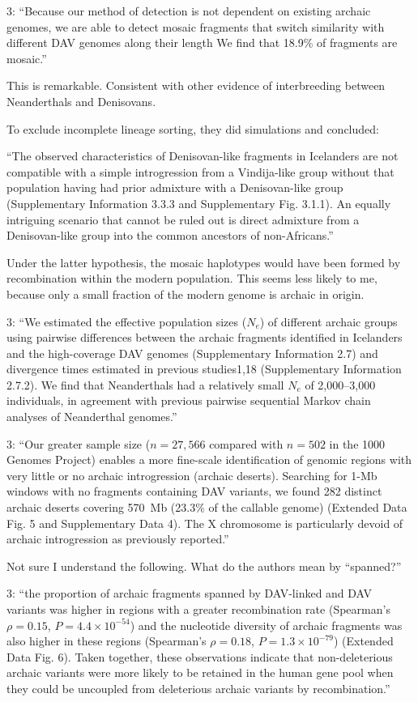 \documentclass{article}
\begin{document}
3: ``Because our method of detection is not dependent on existing
archaic genomes, we are able to detect mosaic fragments that switch
similarity with different DAV genomes along their length We find that
18.9\% of fragments are mosaic.''

This is remarkable. Consistent with other evidence of interbreeding
between Neanderthals and Denisovans.

To exclude incomplete lineage sorting, they did simulations and
concluded:

``The observed characteristics of Denisovan-like fragments in
Icelanders are not compatible with a simple introgression from a
Vindija-like group without that population having had prior admixture
with a Denisovan-like group (Supplementary Information 3.3.3 and
Supplementary Fig. 3.1.1). An equally intriguing scenario that cannot
be ruled out is direct admixture from a Denisovan-like group into the
common ancestors of non-Africans.''

Under the latter hypothesis, the mosaic haplotypes would have been
formed by recombination within the modern population. This seems less
likely to me, because only a small fraction of the modern genome is
archaic in origin.

3: ``We estimated the effective population sizes ($N_e$) of different
archaic groups using pairwise differences between the archaic
fragments identified in Icelanders and the high-coverage DAV genomes
(Supplementary Information 2.7) and divergence times estimated in
previous studies1,18 (Supplementary Information 2.7.2). We find that
Neanderthals had a relatively small $N_e$ of 2,000--3,000 individuals,
in agreement with previous pairwise sequential Markov chain analyses
of Neanderthal genomes.''

3: ``Our greater sample size ($n = 27,566$ compared with $n = 502$ in
the 1000 Genomes Project) enables a more fine-scale identification of
genomic regions with very little or no archaic introgression (archaic
deserts). Searching for 1-Mb windows with no fragments containing DAV
variants, we found 282 distinct archaic deserts covering 570~Mb
(23.3\% of the callable genome) (Extended Data Fig. 5 and
Supplementary Data 4). The X chromosome is particularly devoid of
archaic introgression as previously reported.''

Not sure I understand the following. What do the authors mean by
``spanned?''

3: ``the proportion of archaic fragments spanned by DAV-linked and DAV
variants was higher in regions with a greater recombination rate
(Spearman’s $\rho = 0.15$, $P = 4.4 \times 10^{-54}$) and the
nucleotide diversity of archaic fragments was also higher in these
regions (Spearman’s $\rho = 0.18$, $P = 1.3 \times 10^{-79}$)
(Extended Data Fig. 6). Taken together, these observations indicate
that non-deleterious archaic variants were more likely to be retained
in the human gene pool when they could be uncoupled from deleterious
archaic variants by recombination.''
\end{document}
